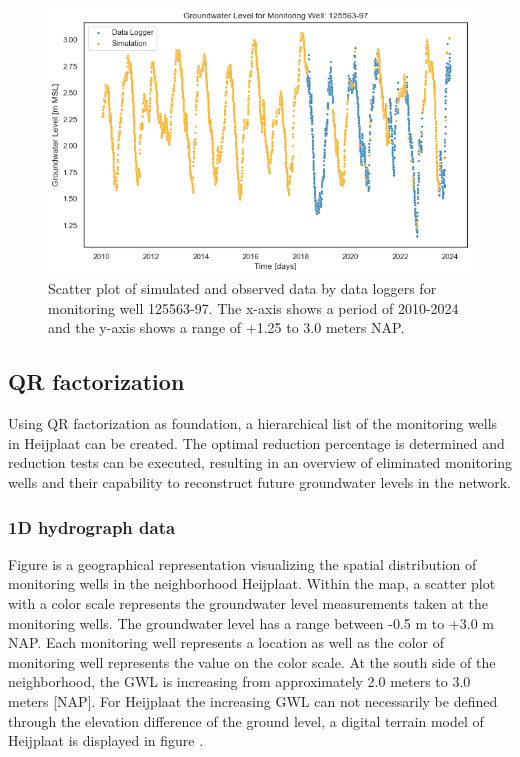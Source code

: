\begin{figure}[htbp]
    \centering
    \includegraphics[width=0.80\linewidth]{frontmatter/Heijplaat-fig/Figure 2024-03-12 094846 (94).png}
    \caption{Scatter plot of simulated and observed data by data loggers for monitoring well 125563-97. The x-axis shows a period of 2010-2024 and the y-axis shows a range of +1.25 to 3.0 meters NAP.}  
    \label{scatterheij}
\end{figure}

\subsection{QR factorization}
Using QR factorization as foundation, a hierarchical list of the monitoring wells in Heijplaat can be created. The optimal reduction percentage is determined and reduction tests can be executed, resulting in an overview of eliminated monitoring wells and their capability to reconstruct future groundwater levels in the network.

\subsubsection{1D hydrograph data}
Figure  is a geographical representation visualizing the spatial distribution of monitoring wells in the neighborhood Heijplaat. Within the map, a scatter plot with a color scale represents the groundwater level measurements taken at the monitoring wells. The groundwater level has a range between -0.5 m to +3.0 m NAP. Each monitoring well represents a location as well as the color of monitoring well represents the value on the color scale. At the south side of the neighborhood, the GWL is increasing from approximately 2.0 meters to 3.0 meters [NAP]. For Heijplaat the increasing GWL can not necessarily be defined through the elevation difference of the ground level, a digital terrain model of Heijplaat is displayed in figure . 

